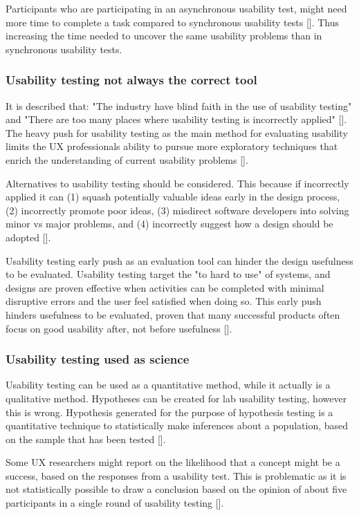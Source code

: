 Participants who are participating in an asynchronous usability test, might need more time to complete a task compared to synchronous usability tests [\cite{ola_2019}]. Thus increasing the time needed to uncover the same usability problems than in synchronous usability tests.

\subsubsection{Usability testing not always the correct tool}
It is described that: "The industry have blind faith in the use of usability testing" and "There are too many places where usability testing is incorrectly applied" [\cite{pgd_2020}]. The heavy push for usability testing as the main method for evaluating usability limits the UX professionals ability to pursue more exploratory techniques that enrich the understanding of current usability problems [\cite{pgd_2020}]. 

Alternatives to usability testing should be considered. This because if incorrectly applied it can (1) squash potentially valuable ideas early in the design process, (2) incorrectly promote poor ideas, (3) misdirect software developers into solving minor vs major problems, and (4) incorrectly suggest how a design should be adopted [\cite{sg_2008}].

Usability testing early push as an evaluation tool can hinder the design usefulness to be evaluated. Usability testing target the "to hard to use" of systems, and designs are proven effective when activities can be completed with minimal disruptive errors and the user feel satisfied when doing so. This early push hinders usefulness to be evaluated, proven that many successful products often focus on good usability after, not before usefulness [\cite{sg_2008}].

\subsubsection{Usability testing used as science}
Usability testing can be used as a quantitative method, while it actually is a qualitative method. Hypotheses can be created for lab usability testing, however this is wrong. Hypothesis generated for the purpose of hypothesis testing is a quantitative technique to statistically make inferences about a population, based on the sample that has been tested [\cite{pgd_2020}].

Some UX researchers might report on the likelihood that a concept might be a success, based on the responses from a usability test. This is problematic as it is not statistically possible to draw a conclusion based on the opinion of about five participants in a single round of usability testing [\cite{pgd_2020}].

